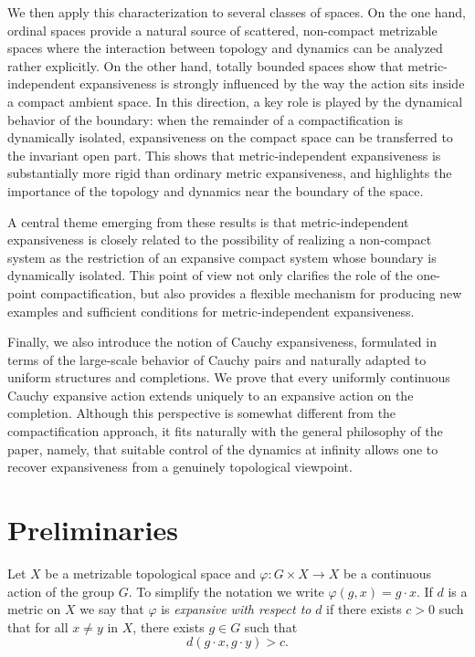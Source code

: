 \documentclass[12pt]{amsart}
\theoremstyle{plain}
\theoremstyle{definition}
\theoremstyle{remark}
\begin{document}
We then apply this characterization to several classes of spaces. On the one hand, ordinal spaces provide a natural source of scattered, non-compact metrizable spaces where the interaction between topology and dynamics can be analyzed rather explicitly. On the other hand, totally bounded spaces show that metric-independent expansiveness is strongly influenced by the way the action sits inside a compact ambient space. In this direction, a key role is played by the dynamical behavior of the boundary: when the remainder of a compactification is dynamically isolated, expansiveness on the compact space can be transferred to the invariant open part. This shows that metric-independent expansiveness is substantially more rigid than ordinary metric expansiveness, and highlights the importance of the topology and dynamics near the boundary of the space.

A central theme emerging from these results is that metric-independent expansiveness is closely related to the possibility of realizing a non-compact system as the restriction of an expansive compact system whose boundary is dynamically isolated. This point of view not only clarifies the role of the one-point compactification, but also provides a flexible mechanism for producing new examples and sufficient conditions for metric-independent expansiveness.

Finally, we also introduce the notion of Cauchy expansiveness, formulated in terms of the large-scale behavior of Cauchy pairs and naturally adapted to uniform structures and completions. We prove that every uniformly continuous Cauchy expansive action extends uniquely to an expansive action on the completion. Although this perspective is somewhat different from the compactification approach, it fits naturally with the general philosophy of the paper, namely, that suitable control of the dynamics at infinity allows one to recover expansiveness from a genuinely topological viewpoint.

\section{Preliminaries}
Let \(X\) be a metrizable topological space and \(\varphi : G \times X \to X\) be a continuous action of the group $G$.
To simplify the notation we write $\varphi(g,x)=g \cdot x$.
If $d$ is a metric on $X$ we say that $\varphi$ is \textit{expansive with respect to} $d$ if
there exists \(c > 0\) such that for all \(x \neq y\) in \(X\), there exists \(g \in G\) such that
$$d(g \cdot x, g \cdot y) > c.$$
\end{document}
